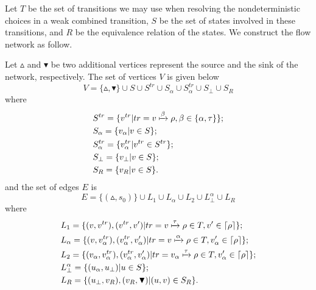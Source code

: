 \documentclass[runningheads]{llncs}
\begin{document}
Let $T$ be the set of transitions we may use when resolving the nondeterministic choices in a weak combined transition, $S$ be the set of states involved in these transitions, and $R$ be the equivalence relation of the states. We construct the flow network as follow.

Let $\vartriangle$ and $\blacktriangledown$ be two additional vertices represent the source and the sink of the network, respectively. The set of vertices $V$ is given below
\[V=\{\vartriangle,\blacktriangledown\}\cup S\cup S^{tr}\cup S_{\alpha}\cup S_{\alpha}^{tr}\cup S_{\bot}\cup S_{R}\] where
\begin{equation*}
    \begin{aligned}
    & S^{tr}=\{v^{tr}|tr=v \xmapsto{\beta} \rho ,\beta\in\{\alpha,\tau\}\};\\
    & S_{\alpha}=\{v_{\alpha}|v\in S\};\\
    & S_{\alpha}^{tr}=\{v_{\alpha}^{tr}|v^{tr}\in S^{tr}\};\\
    & S_{\bot}=\{v_{\bot}|v\in S\};\\
    & S_{R}=\{v_{R}|v\in S\}.
    \end{aligned}
\end{equation*}
and the set of edges $E$ is
\[E=\{(\vartriangle,s_{0})\}\cup L_{1}\cup L_{\alpha}\cup L_{2}\cup L_{\bot}^{\alpha}\cup L_{R}\] where
\begin{equation*}
    \begin{aligned}
    & L_{1}=\{(v,v^{tr}),(v^{tr},v')|tr=v\xmapsto{\tau}\rho\in T,v'\in\lceil\rho\rceil\};\\
    & L_{\alpha}=\{(v,v_{\alpha}^{tr}),(v_{\alpha}^{tr},v'_{\alpha})|tr=v\xmapsto{\alpha}\rho\in T,v'_{\alpha}\in\lceil\rho\rceil\};\\
    & L_{2}=\{(v_{\alpha},v_{\alpha}^{tr}),(v_{\alpha}^{tr},v'_{\alpha})|tr=v_{\alpha}\xmapsto{\tau}\rho\in T,v'_{\alpha}\in\lceil\rho\rceil\};\\
    & L_{\bot}^{\alpha}=\{(u_{
    \alpha},u_{\bot})|u\in S\};\\
    & L_{R}=\{(u_{\bot},v_{R}),(v_{R},\blacktriangledown)|(u,v)\in S_{R}\}.
    \end{aligned}
\end{equation*}
\end{document}
